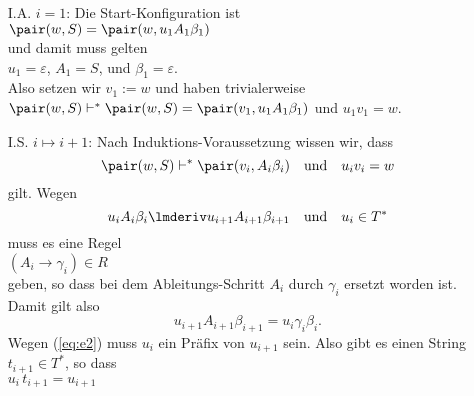 \begin{enumerate}
\item[I.A.] $i=1$: Die Start-Konfiguration ist 
            \\[0.2cm]
            \hspace*{1.3cm}
            $\pair(w,S) = \pair(w,u_1A_1\beta_1)$
            \\[0.2cm]
            und damit muss gelten
            \\[0.2cm]
            \hspace*{1.3cm}
            $u_1 = \varepsilon$, \quad $A_1 = S$, \quad und \quad $\beta_1 = \varepsilon$.  
            \\[0.2cm]
            Also setzen wir $v_1 := w$ und haben trivialerweise
            \\[0.2cm]
            \hspace*{1.3cm}
            $\pair(w,S) \vdash^* \pair(w,S) = \pair(v_1,u_1A_1\beta_1)$ \quad und $u_1v_1 = w$.
\item[I.S.] $i \mapsto i + 1$: 
            Nach Induktions-Voraussetzung wissen wir, dass
            \begin{equation}
              \label{eq:e1}
            \pair(w, S) \vdash^* \pair(v_i,A_i\beta_i) \quad \mbox{und} \quad u_iv_i = w
            \end{equation}
            gilt.  Wegen
            \begin{equation}
              \label{eq:e2}
            u_iA_i\beta_i \lmderiv u_{i+1}A_{i+1}\beta_{i+1} \quad \mbox{und}\quad u_i \in T^*
            \end{equation}
            muss es eine Regel 
            \\[0.2cm]
            \hspace*{1.3cm}
            $(A_i \rightarrow \gamma_i) \in R$
            \\[0.2cm]
            geben, so dass bei dem Ableitungs-Schritt $A_i$ durch $\gamma_i$ ersetzt
            worden ist.  Damit gilt also
            \begin{equation}
              \label{eq:e3}
            u_{i+1}A_{i+1}\beta_{i+1} = u_i\gamma_i\beta_i.              
            \end{equation}
            Wegen (\ref{eq:e2}) muss $u_i$ ein Pr\"afix von $u_{i+1}$ sein.  Also gibt es einen
            String $t_{i+1}\in T^*$, so dass
            \\[0.2cm]
            \hspace*{1.3cm}
            $u_i\, t_{i+1} = u_{i+1}$

\end{enumerate}
